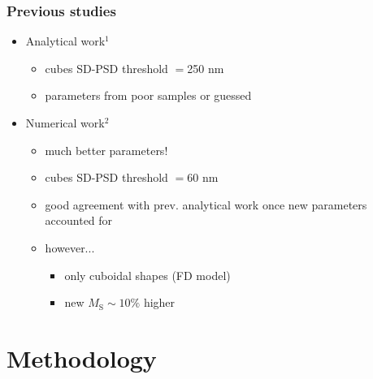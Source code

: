 \documentclass{beamer}
\begin{document}
                \begin{frame}
                  \frametitle{Previous studies}
                  \begin{itemize}
                    \item Analytical work$^\text{1}$
                      \begin{itemize}
                        \item cubes SD-PSD threshold $=$250 nm
                        \item \alert{parameters from poor samples or guessed}
                      \end{itemize}
                    \item Numerical work$^{\text{2}}$
                      \begin{itemize}
                        \item \alert{much better parameters!}
                        \item cubes SD-PSD threshold $=$60 nm
                        \item good agreement with prev. analytical work once new parameters accounted for
                        \item \alert{however...}
                          \begin{itemize}
                            \item only cuboidal shapes (FD model)
                            \item new $\textit{M}_{\text{S}}\sim\text{10}\text{\%}$ higher
                          \end{itemize}
                      \end{itemize}
                  \end{itemize}
                \end{frame}
                
	\section{Methodology}
        
\end{document}
